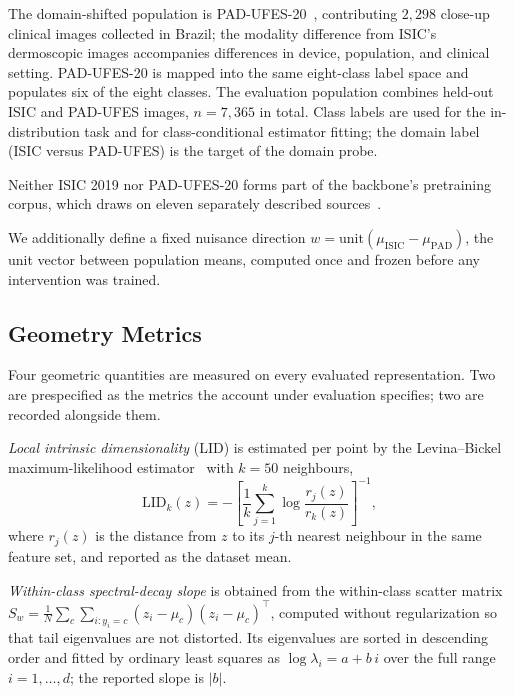 The domain-shifted population is PAD-UFES-20~\cite{pacheco2020padufes},
contributing $2{,}298$ close-up clinical images collected in Brazil; the
modality difference from ISIC's dermoscopic images accompanies differences in
device, population, and clinical setting. PAD-UFES-20 is mapped into the same
eight-class label space and populates six of the eight classes. The
evaluation population combines held-out ISIC and PAD-UFES images, $n =
7{,}365$ in total. Class labels are used for the in-distribution task and for
class-conditional estimator fitting; the domain label (ISIC versus PAD-UFES)
is the target of the domain probe.

Neither ISIC 2019 nor PAD-UFES-20 forms part of the backbone's pretraining
corpus, which draws on eleven separately described
sources~\cite{yan2025panderm}.

We additionally define a fixed nuisance direction
$w = \mathrm{unit}(\mu_{\mathrm{ISIC}} - \mu_{\mathrm{PAD}})$, the unit vector
between population means, computed once and frozen before any intervention
was trained.

\subsection{Geometry Metrics}

Four geometric quantities are measured on every evaluated representation. Two
are prespecified as the metrics the account under evaluation specifies; two
are recorded alongside them.

\emph{Local intrinsic dimensionality} (LID) is estimated per point by the
Levina--Bickel maximum-likelihood estimator~\cite{levina2004maximum} with
$k = 50$ neighbours,
\begin{equation}
  \mathrm{LID}_k(z) = -\left[\frac{1}{k}\sum_{j=1}^{k}
    \log \frac{r_j(z)}{r_k(z)}\right]^{-1},
\end{equation}
where $r_j(z)$ is the distance from $z$ to its $j$-th nearest neighbour in the
same feature set, and reported as the dataset mean.

\emph{Within-class spectral-decay slope} is obtained from the within-class
scatter matrix $S_w = \frac{1}{N}\sum_c \sum_{i: y_i = c} (z_i - \mu_c)(z_i -
\mu_c)^{\top}$, computed without regularization so that tail eigenvalues are
not distorted. Its eigenvalues are sorted in descending order and fitted by
ordinary least squares as $\log \lambda_i = a + b\,i$ over the full range
$i = 1,\dots,d$; the reported slope is $|b|$.

